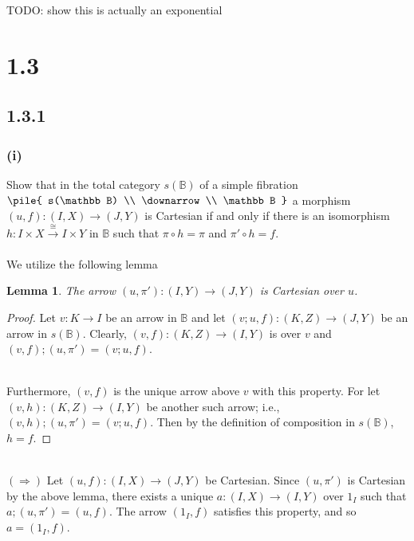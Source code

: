 \documentclass{article}
\newtheorem{lemma}{Lemma}
\newcommand{\vrt}[2]{
\pile{
#1 \\
\downarrow \\
#2
}
}
\begin{document}
TODO: show this is actually an exponential

\section*{1.3}

\subsection*{1.3.1}

\subsubsection*{(i)}

Show that in the total category $s(\mathbb B)$ of a simple fibration $\vrt{s(\mathbb B)}{\mathbb B}$ a morphism
$(u,f) : (I,X) \to (J,Y)$ is Cartesian if and only if there is an isomorphism $h : I \times X \overset{\cong}{\to} I \times Y$
in $\mathbb B$ such that $\pi \circ h = \pi$ and $\pi' \circ h = f$.
\\~\\
We utilize the following lemma
\begin{lemma}
\label{lemma:one}
The arrow $(u, \pi') : (I,Y) \to (J,Y)$ is Cartesian over $u$.
\end{lemma}

\begin{proof}
Let $v : K \to I$ be an arrow in $\mathbb B$ and let $(v;u,f) : (K,Z) \to (J,Y)$ be an arrow in $s(\mathbb B)$.
Clearly, $(v,f) : (K,Z) \to (I,Y)$ is over $v$ and $(v,f);(u,\pi') = (v;u,f)$.\\~\\
\begin{center}
\end{center}

Furthermore, $(v,f)$ is the unique arrow above $v$ with this property. For let $(v,h) : (K,Z) \to (I,Y)$ be another such
arrow; i.e., $(v,h);(u,\pi') = (v;u,f)$. Then by the definition of composition in $s(\mathbb B)$, $h = f$. 

\end{proof}
~\\
$(\Rightarrow)$ Let $(u,f) : (I,X) \to (J,Y)$ be Cartesian. 
Since $(u,\pi')$ is Cartesian by the above lemma, there exists a unique $a : (I,X) \to (I,Y)$ over $1_I$ 
such that $a;(u,\pi') = (u,f)$. The arrow $(1_I,f)$ satisfies this property, and so $a = (1_I, f)$. 
\end{document}
